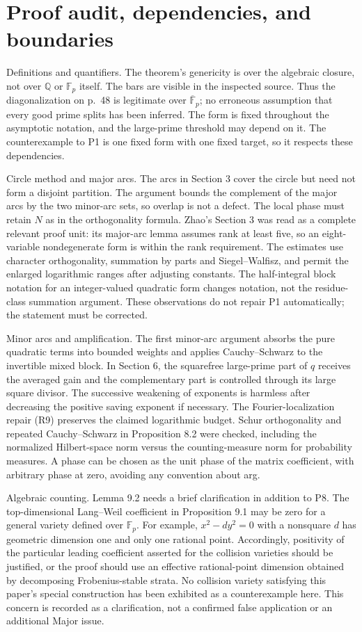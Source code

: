 \documentclass[10pt]{article}
\begin{document}
\section*{Proof audit, dependencies, and boundaries}
Definitions and quantifiers. The theorem’s genericity is over the algebraic closure, not over \(\mathbb Q\) or \(\mathbb F_p\) itself. The bars are visible in the inspected source. Thus the diagonalization on p. 48 is legitimate over \(\overline{\mathbb F}_p\); no erroneous assumption that every good prime splits has been inferred. The form is fixed throughout the asymptotic notation, and the large-prime threshold may depend on it. The counterexample to P1 is one fixed form with one fixed target, so it respects these dependencies.\par
Circle method and major arcs. The arcs in Section 3 cover the circle but need not form a disjoint partition. The argument bounds the complement of the major arcs by the two minor-arc sets, so overlap is not a defect. The local phase must retain \(N\) as in the orthogonality formula. Zhao’s Section 3 was read as a complete relevant proof unit: its major-arc lemma assumes rank at least five, so an eight-variable nondegenerate form is within the rank requirement. The estimates use character orthogonality, summation by parts and Siegel–Walfisz, and permit the enlarged logarithmic ranges after adjusting constants. The half-integral block notation for an integer-valued quadratic form changes notation, not the residue-class summation argument. These observations do not repair P1 automatically; the statement must be corrected.\par
Minor arcs and amplification. The first minor-arc argument absorbs the pure quadratic terms into bounded weights and applies Cauchy–Schwarz to the invertible mixed block. In Section 6, the squarefree large-prime part of \(q\) receives the averaged gain and the complementary part is controlled through its large square divisor. The successive weakening of exponents is harmless after decreasing the positive saving exponent if necessary. The Fourier-localization repair (R9) preserves the claimed logarithmic budget. Schur orthogonality and repeated Cauchy–Schwarz in Proposition 8.2 were checked, including the normalized Hilbert-space norm versus the counting-measure norm for probability measures. A phase can be chosen as the unit phase of the matrix coefficient, with arbitrary phase at zero, avoiding any convention about arg.\par
Algebraic counting. Lemma 9.2 needs a brief clarification in addition to P8. The top-dimensional Lang–Weil coefficient in Proposition 9.1 may be zero for a general variety defined over \(\mathbb F_p\). For example, \(x^2-dy^2=0\) with a nonsquare \(d\) has geometric dimension one and only one rational point. Accordingly, positivity of the particular leading coefficient asserted for the collision varieties should be justified, or the proof should use an effective rational-point dimension obtained by decomposing Frobenius-stable strata. No collision variety satisfying this paper’s special construction has been exhibited as a counterexample here. This concern is recorded as a clarification, not a confirmed false application or an additional Major issue.\par
\end{document}
